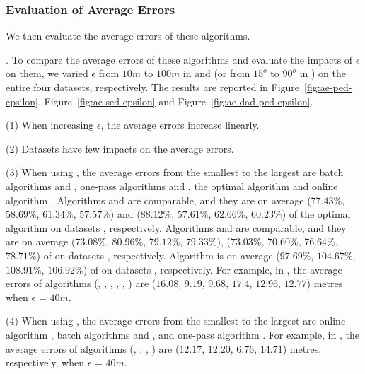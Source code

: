 \subsubsection{Evaluation of Average Errors}
We then evaluate the average errors of these algorithms.





.
To compare the average errors of these algorithms and evaluate the impacts of $\epsilon$ on them, we varied $\epsilon$ from $10m$ to $100m$ in \ped and \sed (or from $15^o$ to $90^o$ in \dad) on the entire four datasets, respectively.
The results are reported in Figure~\ref{fig:ae-ped-epsilon}, Figure~\ref{fig:ae-sed-epsilon} and Figure~\ref{fig:ae-dad-ped-epsilon}.


\sstab (1) When increasing $\epsilon$, the average errors increase linearly.

\sstab (2) Datasets have few impacts on the average errors.

\sstab (3) When using \ped, the average errors from the smallest
to the largest are batch algorithms \tpa and \dpa, one-pass
algorithms \siped and \operb, the optimal algorithm \opt and online algorithm \bqsa.
Algorithms \tpa and
\dpa are comparable, and they are on average ($77.43\%$, $58.69\%$, $61.34\%$,
$57.57\%$) and ($88.12\%$, $57.61\%$, $62.66\%$, $60.23\%$) of the optimal algorithm \opt on datasets \dSets, respectively.
Algorithms \siped and \operb are comparable, and they are on average
($73.08\%$, $80.96\%$, $79.12\%$, $79.33\%$), ($73.03\%$, $70.60\%$, $76.64\%$, $78.71\%$) of \opt on datasets \dSets, respectively.
Algorithm \bqsa is on average ($97.69\%$, $104.67\%$, $108.91\%$, $106.92\%$) of \opt on datasets \dSets, respectively.
%
For example, in \mopsi, the average errors of algorithms
(\opt, \tpa, \dpa, \bqsa, \siped, \operb ) are ($16.08$, $9.19$, $9.68$, $17.4$, $12.96$, $12.77$)  metres when $\epsilon$ = $40m$.

\sstab (4) When using \sed, the average errors from the smallest
to the largest are online algorithm \squishe, batch algorithms \tpa and \dpa,
and one-pass algorithm \cised.
For example, in \mopsi, the average errors of algorithms
(\tpa, \dpa, \squishe, \cised) are ($12.17$, $12.20$, $6.76$, $14.71$) metres, respectively, when $\epsilon$ = $40m$.


